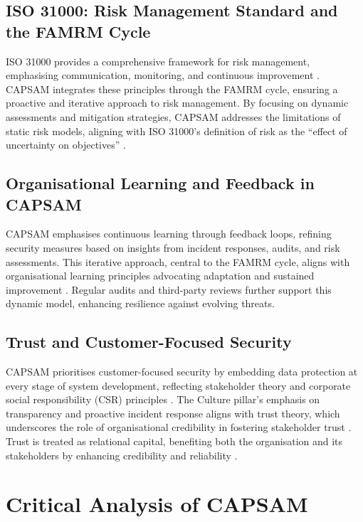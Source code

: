     \subsection{ISO 31000: Risk Management Standard and the FAMRM Cycle}
    ISO 31000 provides a comprehensive framework for risk management, emphasising communication, monitoring, and continuous improvement \citep{purdy2010iso}. CAPSAM integrates these principles through the FAMRM cycle, ensuring a proactive and iterative approach to risk management. By focusing on dynamic assessments and mitigation strategies, CAPSAM addresses the limitations of static risk models, aligning with ISO 31000's definition of risk as the ``effect of uncertainty on objectives'' \citep{purdy2010iso}.
    
    \subsection{Organisational Learning and Feedback in CAPSAM}
    CAPSAM emphasises continuous learning through feedback loops, refining security measures based on insights from incident responses, audits, and risk assessments. This iterative approach, central to the FAMRM cycle, aligns with organisational learning principles advocating adaptation and sustained improvement \citep{murray2003continuous}. Regular audits and third-party reviews further support this dynamic model, enhancing resilience against evolving threats.
    
    \subsection{Trust and Customer-Focused Security}
    CAPSAM prioritises customer-focused security by embedding data protection at every stage of system development, reflecting stakeholder theory and corporate social responsibility (CSR) principles \citep{moir2001csr, parmar2010stakeholder}. The Culture pillar's emphasis on transparency and proactive incident response aligns with trust theory, which underscores the role of organisational credibility in fostering stakeholder trust \citep{castelfranchi2010trust}. Trust is treated as relational capital, benefiting both the organisation and its stakeholders by enhancing credibility and reliability \citep{castelfranchi2010trust}.      

\section{Critical Analysis of CAPSAM}
